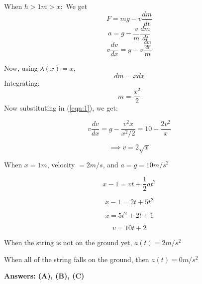 \documentclass[11pt,a4paper]{scrartcl}
\begin{document}
\begin{solution}
When $h>1m>x$:\
We get $$F= mg- v\frac{dm}{dt}$$
$$a= g- \frac{v}{m}\frac{dm}{dt}$$
\begin{equation}
\label{eqn:1}
v \frac{dv}{dx} = g- v\frac{\frac{dm}{dt}}{m}
\end{equation}

Now, using $\lambda(x)=x$, $$dm = x dx$$
Integrating:
$$m = \frac{x^2}{2}$$
Now substituting in (\ref{eqn:1}), we get:

\[v \frac{dv}{dx}=g-\frac{v^2x}{x^2/2}=10-\frac{2v^2}{x}\]

\[\implies v=2\sqrt{x}\]

\vspace{3mm}

When $x=1m$, velocity $= 2 m/s$, and $a=g=10 m/s^2$

\[x-1=vt+\frac{1}{2}at^2\]

\[x-1=2t+5t^2\]

\[x=5t^2+2t+1\]

\[v=10t+2\]

\vspace{3mm}

When the string is not on the ground yet, $a(t)=2 m/s^2$ 

When all of the string falls on the ground, then $a(t)=0 m/s^2$

\textbf{Answers: (A), (B), (C)}

\end{solution}
\vspace{1cm}%
\end{document}
